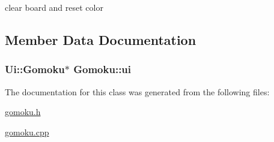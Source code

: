 clear board and reset color 



\subsection{Member Data Documentation}
\subsubsection[{\texorpdfstring{ui}{ui}}]{\setlength{\rightskip}{0pt plus 5cm}Ui\+::\+Gomoku$\ast$ Gomoku\+::ui\hspace{0.3cm}{\ttfamily [private]}}\hypertarget{classGomoku_ac7bd58f9bde18d468518e5f78c458cf9}{}\label{classGomoku_ac7bd58f9bde18d468518e5f78c458cf9}


The documentation for this class was generated from the following files\+:\begin{DoxyCompactItemize}
\item 
\hyperlink{gomoku_8h}{gomoku.\+h}\item 
\hyperlink{gomoku_8cpp}{gomoku.\+cpp}\end{DoxyCompactItemize}
